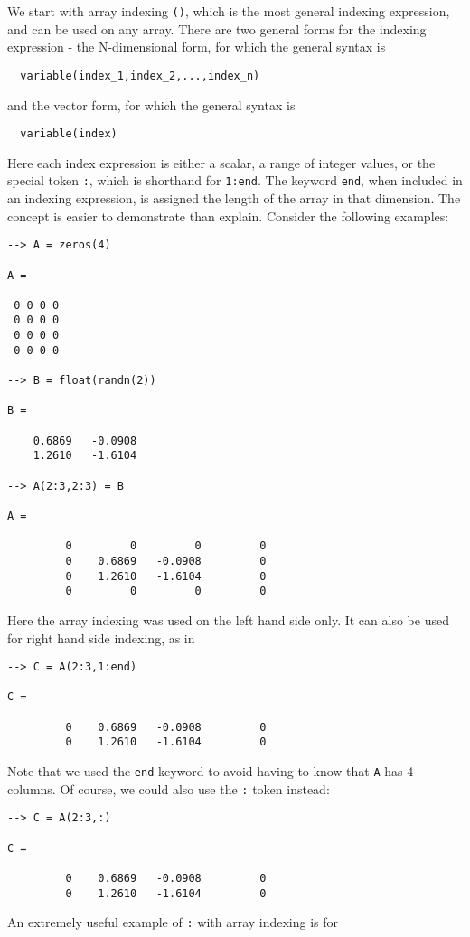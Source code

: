 We start with array indexing \verb|()|,
which is the most general indexing expression, and can be
used on any array.  There are two general forms for the 
indexing expression - the N-dimensional form, for which 
the general syntax is
\begin{verbatim}
  variable(index_1,index_2,...,index_n)
\end{verbatim}
and the vector form, for which the general syntax is
\begin{verbatim}
  variable(index)
\end{verbatim}
Here each index expression is either a scalar, a range
of integer values, or the special token \verb|:|, which is
shorthand for \verb|1:end|.  The keyword \verb|end|, when included
in an indexing expression, is assigned the length of the 
array in that dimension.  The concept is easier to demonstrate
than explain.  Consider the following examples:
\begin{verbatim}
--> A = zeros(4)

A = 

 0 0 0 0 
 0 0 0 0 
 0 0 0 0 
 0 0 0 0 

--> B = float(randn(2))

B = 

    0.6869   -0.0908 
    1.2610   -1.6104 

--> A(2:3,2:3) = B

A = 

         0         0         0         0 
         0    0.6869   -0.0908         0 
         0    1.2610   -1.6104         0 
         0         0         0         0 
\end{verbatim}
Here the array indexing was used on the left hand side only.
It can also be used for right hand side indexing, as in
\begin{verbatim}
--> C = A(2:3,1:end)

C = 

         0    0.6869   -0.0908         0 
         0    1.2610   -1.6104         0 
\end{verbatim}
Note that we used the \verb|end| keyword to avoid having to know
that \verb|A| has 4 columns.  Of course, we could also use the 
\verb|:| token instead:
\begin{verbatim}
--> C = A(2:3,:)

C = 

         0    0.6869   -0.0908         0 
         0    1.2610   -1.6104         0 
\end{verbatim}
An extremely useful example of \verb|:| with array indexing is for
